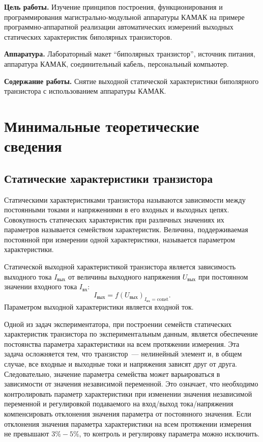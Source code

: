 \def \eng #1{\foreignlanguage{english}{#1}}
\def \engtt #1{\eng{\texttt{\justify #1}}}

\textbf{Цель работы.} Изучение принципов построения, функционирования и программирования магистрально-модульной аппаратуры КАМАК на примере программно-аппаратной реализации автоматических измерений выходных статических характеристик биполярных транзисторов.

\textbf{Аппаратура.} Лабораторный макет \enquote{биполярных транзистор}, источник питания, аппаратура КАМАК, соединительный кабель, персональный компьютер.

\textbf{Содержание работы.} Снятие выходной статической характеристики биполярного транзистора с использованием аппаратуры КАМАК.

\section{Минимальные теоретические сведения}

\subsection{Статические характеристики транзистора}

Статическими характеристиками транзистора называются зависимости между постоянными токами и напряжениями в его входных и выходных цепях. Совокупность статических характеристик при различных значениях их параметров называется семейством характеристик. Величина, поддерживаемая постоянной при измерении одной характеристики, называется параметром характеристики.

Статической выходной характеристикой транзистора является зависимость выходного тока $I_\text{вых}$ от величины выходного напряжения $U_\text{вых}$ при постоянном значении входного тока $I_\text{вх}$:
%
\begin{equation*}
    I_\text{вых} = f(U_\text{вых})_{I_\text{вх} = \mathrm{const}} .
\end{equation*}
%
Параметром выходной характеристики является входной ток.

Одной из задач экспериментатора, при построении семейств статических характеристик транзистора по экспериментальным данным, является обеспечение постоянства параметра характеристики на всем протяжении измерения. Эта задача осложняется тем, что транзистор~--- нелинейный элемент и, в общем случае, все входные и выходные токи и напряжения зависят друг от друга. Следовательно, значение параметра семейства может варьироваться в зависимости от значения независимой переменной. Это означает, что необходимо контролировать параметр характеристики при изменении значения независимой переменной и регулировкой подаваемого на вход/выход тока/напряжения компенсировать отклонения значения параметра от постоянного значения. Если отклонения значения параметра характеристики на всем протяжении измерения не превышают $3\%-5\%$, то контроль и регулировку параметра можно исключить.

